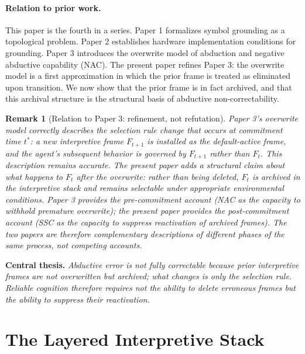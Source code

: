 \documentclass[12pt]{article}
\newtheorem{remark}{Remark}
\begin{document}
\paragraph{Relation to prior work.}
This paper is the fourth in a series.
Paper 1 \cite{minamoto2026topology} formalizes symbol grounding
as a topological problem.
Paper 2 \cite{minamoto2026cgla} establishes hardware implementation
conditions for grounding.
Paper 3 \cite{minamoto2026overwrite} introduces the overwrite model
of abduction and negative abductive capability (NAC).
The present paper refines Paper 3: the overwrite model is a
first approximation in which the prior frame is treated as
eliminated upon transition.
We now show that the prior frame is in fact archived, and that
this archival structure is the structural basis of abductive
non-correctability.

\begin{remark}[Relation to Paper 3: refinement, not refutation]
Paper 3's overwrite model correctly describes the \emph{selection rule
change} that occurs at commitment time $t^*$: a new interpretive frame
$F_{t+1}$ is installed as the default-active frame, and the agent's
subsequent behavior is governed by $F_{t+1}$ rather than $F_t$.
This description remains accurate. The present paper adds a structural
claim about what happens to $F_t$ after the overwrite: rather than
being deleted, $F_t$ is archived in the interpretive stack and remains
selectable under appropriate environmental conditions. Paper 3 provides
the pre-commitment account (NAC as the capacity to withhold premature
overwrite); the present paper provides the post-commitment account (SSC
as the capacity to suppress reactivation of archived frames). The two
papers are therefore complementary descriptions of different phases of
the same process, not competing accounts.
\end{remark}

\medskip
\noindent\textbf{Central thesis.}
\emph{Abductive error is not fully correctable because prior interpretive
frames are not overwritten but archived; what changes is only the
selection rule. Reliable cognition therefore requires not the
ability to delete erroneous frames but the ability to suppress
their reactivation.}

\section{The Layered Interpretive Stack}
\end{document}
